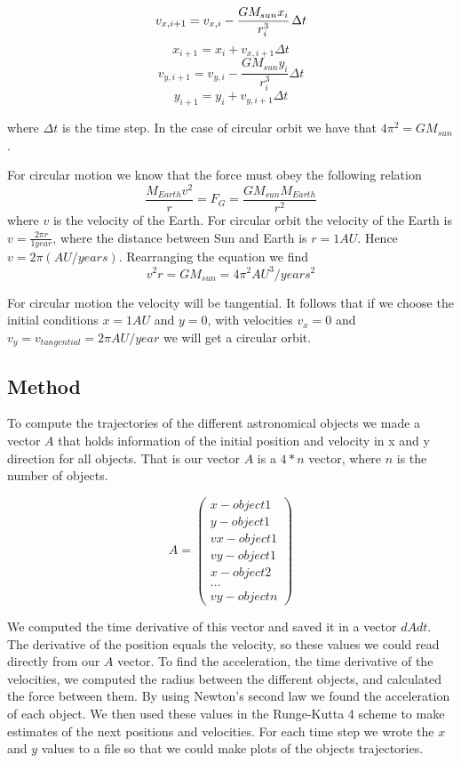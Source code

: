 \documentclass[a4paper,12pt, english]{article}
\begin{document}
$$v_{x,i+1} = v_{x,i} - \frac{G M_{sun} x_i}{r_i ^3} \hspace{0.5mm} \Delta t $$ 
$$x_{i+1} = x_i + v_{x,i+1} \Delta t $$
$$v_{y,i+1} = v_{y,i} - \frac{G M_{sun} y_i}{r_i ^3} \Delta t $$
$$y_{i+1} = y_i + v_{y,i+1} \Delta t $$


where $\Delta t$ is the time step. In the case of circular orbit we have that $4 \pi ^2 = GM_{sun}$.

For circular motion we know that the force must obey the following relation 
$$\frac{M_{Earth}v^2}{r} = F_G = \frac{GM_{sun}M_{Earth}}{r^2}$$ where $v$ is the velocity of the Earth. 
For circular orbit the velocity of the Earth is $v = \frac{2 \pi r}{1 year}$, where the distance between Sun and Earth is $r = 1 AU$. Hence $v = 2 \pi (AU/years)$. Rearranging the equation we find
$$v^2r = GM_{sun} = 4 \pi ^2 AU^3/years^2$$

For circular motion the velocity will be tangential. It follows that if we choose the initial conditions $ x = 1 AU $ and $ y = 0$, with velocities $v_x = 0$ and $v_y = v_{tangential} = 2 \pi AU/year$ we will get a circular orbit.  


\subsection*{Method}
To compute the trajectories of the different astronomical objects we made a vector $A$ that holds information of the initial position and velocity in x and y direction for all objects. That is our vector $A$ is a $4*n$ vector, where $n$ is the number of objects.

\[ A = \left( \begin{array}{c}
x - object 1\\
y - object 1\\
vx - object 1\\
vy -object 1\\
x - object 2\\
... \\
vy - object n \end{array} \right)\]   

We computed the time derivative of this vector and saved it in a vector $dAdt$. The derivative of the position equals the velocity, so these values we could read directly from our $A$ vector. 
To find the acceleration, the time derivative of the velocities, we computed the radius between the different objects, and calculated the force between them. By using Newton's second law we found the acceleration of each object. We then used these values in the Runge-Kutta 4 scheme to make estimates of the next positions and velocities. For each time step we wrote the $x$ and $y$ values to a file so that we could make plots of the objects trajectories.    
\end{document}
